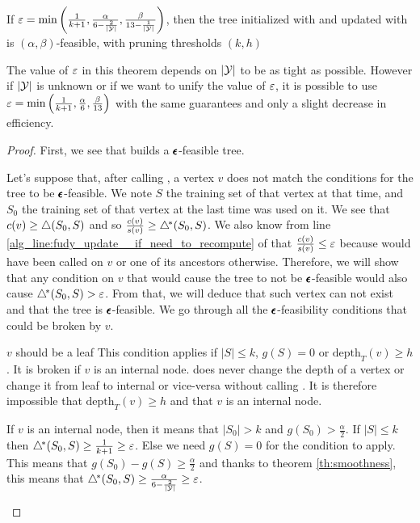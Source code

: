 \begin{theorem}\label{th:fudy_is_epsfeasible}
    If $\varepsilon=\min\left(\frac{1}{k+1}, \frac{\alpha}{6-\frac{2}{|\mathcal{Y}|}}, \frac{\beta}{13 - \frac{1}{|\mathcal{Y}|}}\right)$, then the tree initialized with \AlgoBuild{} and updated with \AlgoUpdate{} is $(\alpha, \beta)$-feasible, with pruning thresholds $(k, h)$
\end{theorem}
The value of $\varepsilon$ in this theorem depends on $|\mathcal{Y}|$ to be as tight as possible. However if $|\mathcal{Y}|$ is unknown or if we want to unify the value of $\varepsilon$, it is possible to use $\varepsilon=\min\left(\frac{1}{k+1}, \frac{\alpha}{6}, \frac{\beta}{13}\right)$ with the same guarantees and only a slight decrease in efficiency.
\begin{proof}
    First, we see that \AlgoBuild{} builds a $\pmb{\epsilon}$-feasible tree. 
    
    Let's suppose that, after calling \AlgoUpdate{}, a vertex $v$ does not match the conditions for the tree to be $\pmb{\epsilon}$-feasible. We note $S$ the training set of that vertex at that time, and $S_0$ the training set of that vertex at the last time \AlgoBuild{} was used on it. We see that $c(v) \geq \triangle(S_0, S)$ and so $\frac{c(v)}{s(v)} \geq \triangle^{\!*}(S_0, S)$. We also know from line \ref{alg_line:fudy_update__if_need_to_recompute} of \AlgoUpdate{} that   $\frac{c(v)}{s(v)} \leq \varepsilon$ because \AlgoBuild{} would have been called on $v$ or one of its ancestors otherwise. Therefore, we will show that any condition on $v$ that would cause the tree to not be $\pmb{\epsilon}$-feasible would also cause $\triangle^{\!*}(S_0, S) > \varepsilon$. From that, we will deduce that such vertex can not exist and that the tree is $\pmb{\epsilon}$-feasible. We go through all the $\pmb{\epsilon}$-feasibility conditions that could be broken by $v$.

    \begin{paragraph}{$v$ should be a leaf}
        This condition applies if $|S|\leq k$, $g(S) = 0$ or $\text{depth}_T(v) \geq h$. It is broken if $v$ is an internal node. \AlgoUpdate{} does never change the depth of a vertex or change it from leaf to internal or vice-versa without calling \AlgoBuild{}. It is therefore impossible that $\text{depth}_T(v) \geq h$ and that $v$ is an internal node.

        If $v$ is an internal node, then it means that $|S_0| > k$ and $g(S_0) > \frac{\alpha}{2}$. If $|S| \leq k$ then $\triangle^{\!*}(S_0, S) \geq \frac{1}{k+1} \geq \varepsilon$. Else we need $g(S) = 0 $ for the condition to apply. This means that $g(S_0) - g(S) \geq \frac{\alpha}{2}$ and thanks to theorem \ref{th:smoothness}, this means that $\triangle^{\!*}(S_0, S) \geq \frac{\alpha}{6 - \frac{2}{|\mathcal{Y}|}} \geq \varepsilon$.
    \end{paragraph}


\end{proof}
